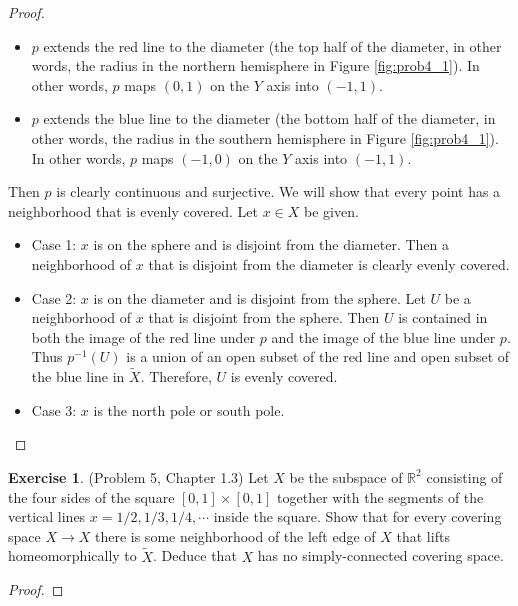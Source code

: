 \documentclass[12pt, psamsfonts]{amsart}
\theoremstyle{definition}
\newtheorem*{exer}{Exercise}
\theoremstyle{remark}
\numberwithin{equation}{section}
\begin{document}
\begin{proof}
\begin{itemize}
\begin{itemize}
        \item
          $p$ extends the red line to the diameter (the top half of the diameter, in other words, the radius in the northern hemisphere in Figure \ref{fig:prob4_1}).
          In other words, $p$ maps $(0, 1)$ on the $Y$ axis into $(-1, 1)$.
        \item
          $p$ extends the blue line to the diameter (the bottom half of the diameter, in other words, the radius in the southern hemisphere in Figure \ref{fig:prob4_1}).
          In other words, $p$ maps $(-1, 0)$ on the $Y$ axis into $(-1, 1)$.
      \end{itemize}
      Then $p$ is clearly continuous and surjective.
      We will show that every point has a neighborhood that is evenly covered.
      Let $x \in X$ be given.
      \begin{itemize}
        \item
          Case 1: $x$ is on the sphere and is disjoint from the diameter.
          Then a neighborhood of $x$ that is disjoint from the diameter is clearly evenly covered.
        \item
          Case 2: $x$ is on the diameter and is disjoint from the sphere.
          Let $U$ be a neighborhood of $x$ that is disjoint from the sphere.
          Then $U$ is contained in both the image of the red line under $p$ and the image of the blue line under $p$.
          Thus $p^{-1}(U)$ is a union of an open subset of the red line and open subset of the blue line in $\tilde{X}$.
          Therefore, $U$ is evenly covered.
        \item
          Case 3: $x$ is the north pole or south pole.
      \end{itemize}
  \end{itemize}
\end{proof}

\begin{exer}{(Problem 5, Chapter 1.3)}
  Let $X$ be the subspace of $\mathbb{R}^2$ consisting of the four sides of the square $[0, 1] \times [0, 1]$ together with the segments of the vertical lines $x = 1/2, 1/3, 1/4, \cdots$ inside the square.
  Show that for every covering space $X \rightarrow X$ there is some neighborhood of the left edge of $X$ that lifts homeomorphically to $\tilde{X}$.
  Deduce that $X$ has no simply-connected covering space.
\end{exer}

\begin{proof}
\end{proof}
\end{document}
